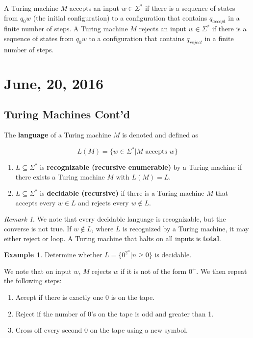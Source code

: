 \documentclass[11pt]{article}
\theoremstyle{plain} %
\theoremstyle{definition}
\theoremstyle{example}
\newtheorem*{example}{Example}
\theoremstyle{remark}
\newtheorem*{remark}{Remark}
\begin{document}
A Turing machine $M$ accepts an input $w \in \Sigma^*$ if there is a sequence of states from $q_0w$ (the initial configuration) to a configuration that contains $q_{accept}$ in a finite number of steps. A Turing machine $M$ rejects an input $w \in \Sigma^*$ if there is a sequence of states from $q_0w$ to a configuration that contains $q_{reject}$ in a finite number of steps. 


\section{June, 20, 2016}
\subsection{Turing Machines Cont'd}

The \textbf{language} of a Turing machine $M$ is denoted and defined as 

$$L(M) = \{w \in \Sigma^* | M \text{ accepts } w\}$$


\begin{enumerate}
	\item $L \subseteq \Sigma^*$ is \textbf{recognizable (recursive enumerable)} by a Turing machine if there exists a Turing machine $M$ with $L(M) = L$. 
	\item $L \subseteq \Sigma^*$ is \textbf{decidable (recursive)} if there is a Turing machine $M$ that accepts every $w \in L$ and rejects every $w \not \in L$.
\end{enumerate}

\begin{remark}
We note that every decidable language is recognizable, but the converse is not true. If $w \not \in L$, where $L$ is recognized by a Turing machine, it may either reject or loop. A Turing machine that halts on all inputs is \textbf{total}.
\end{remark}

\begin{example}
Determine whether $L = \{ 0^{2^n} | n \geq 0 \}$ is decidable.
\end{example}

We note that on input $w$, $M$ rejects $w$ if it is not of the form $0^+$. We then repeat the following steps:

\begin{enumerate}
	\item Accept if there is exactly one 0 is on the tape.
	\item Reject if the number of 0's on the tape is odd and greater than 1.
	\item Cross off every second 0 on the tape using a new symbol.
\end{enumerate}
\end{document}
